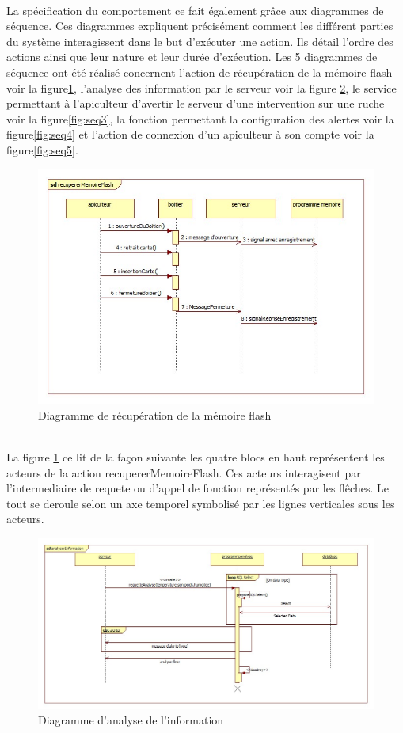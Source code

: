 \\La spécification du comportement ce fait également grâce aux diagrammes de séquence. Ces diagrammes expliquent précisément comment les différent parties du système interagissent dans le but d'exécuter une action. Ils détail l'ordre des actions ainsi que leur nature et leur durée d'exécution. Les 5 diagrammes de séquence ont été réalisé concernent l'action de récupération de la mémoire flash voir la figure\ref{fig:seq1}, l'analyse des information par le serveur voir la figure \ref{fig:seq2}, le service permettant à l'apiculteur d'avertir le serveur d'une intervention sur une ruche voir la figure\ref{fig:seq3}, la fonction permettant la configuration des alertes voir la figure\ref{fig:seq4} et l'action de connexion d'un apiculteur à son compte voir la figure\ref{fig:seq5}.
\begin{figure}[h!]
\centering\includegraphics[scale=0.7]{recupererMemoireFlash.jpg}
\caption{\label{fig:seq1} Diagramme de récupération de la mémoire flash}
\end{figure}
\\La figure \ref{fig:seq1} ce lit de la façon suivante les quatre blocs en haut représentent les acteurs de la action recupererMemoireFlash. Ces acteurs interagisent par l'intermediaire de requete ou d'appel de fonction représentés par les flêches. Le tout se deroule selon un axe temporel symbolisé par les lignes verticales sous les acteurs.
\begin{figure}[h!]
\centering\includegraphics[scale=0.5]{analyserInformation.jpg}
\caption{\label{fig:seq2} Diagramme d'analyse de l'information}
\end{figure}
